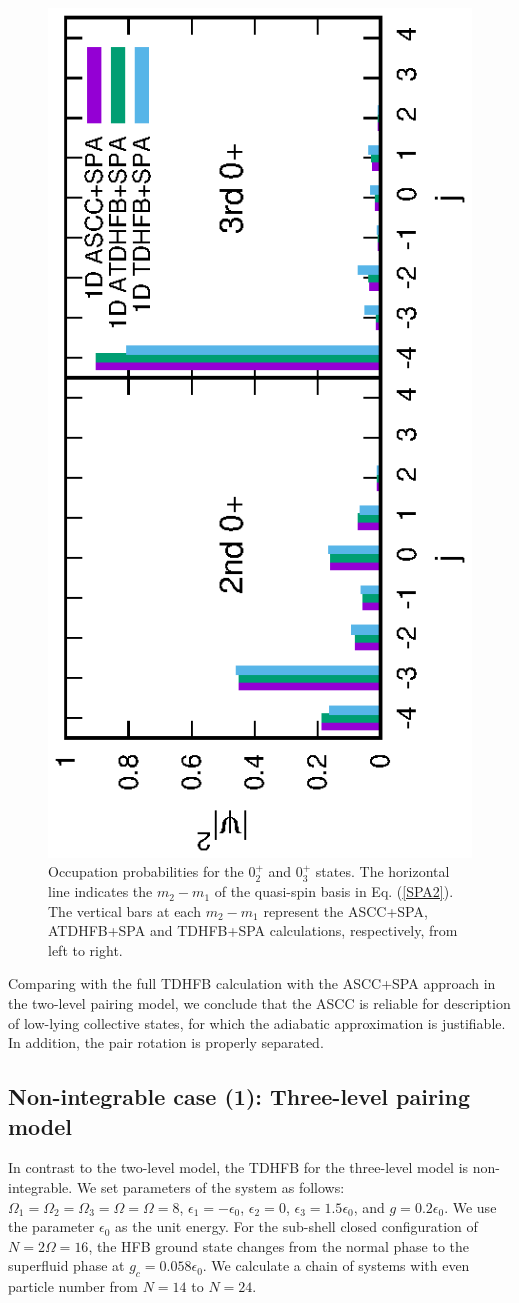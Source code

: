 \documentclass[%
superscriptaddress,
showpacs,
nofootinbib,
amsmath,amssymb,
aps,
prc,
twocolumn,
floatfix ]%
{revtex4-1}
\begin{document}
\begin{figure}[thb]
 \begin{center}
   \includegraphics[height=0.5\textwidth,angle=-90]{N16X3p2occ.eps}
 \end{center}
\caption{
Occupation probabilities for the $0_2^+$ and $0_3^+$ states.
The horizontal line indicates the $m_2-m_1$ of the quasi-spin basis
in Eq. (\ref{SPA2}).
The vertical bars at each $m_2-m_1$
represent the ASCC+SPA, ATDHFB+SPA and TDHFB+SPA calculations,
respectively, from left to right.
}
 \label{fig:N16_occ}
\end{figure}


Comparing with the full TDHFB calculation with the ASCC+SPA approach
in the two-level pairing model,
we conclude that the ASCC is reliable for description of low-lying
collective states, for which the adiabatic approximation is justifiable.
In addition, the pair rotation is properly separated.


\subsection{Non-integrable case (1): Three-level pairing model}
\label{sec:three-level-model}

In contrast to the two-level model,
the TDHFB for the three-level model is non-integrable.
We set parameters of the system as follows:
$\Omega_1=\Omega_2=\Omega_3=\Omega=\Omega=8$,
$\epsilon_1=-\epsilon_0$, $\epsilon_2=0$, $\epsilon_3=1.5\epsilon_0$,
and $g=0.2\epsilon_0$.
We use the parameter $\epsilon_0$ as the unit energy.
For the sub-shell closed configuration of $N=2\Omega=16$,
the HFB ground state changes from the normal phase to
the superfluid phase at $g_c=0.058\epsilon_0$.
We calculate a chain of systems with even particle number
from $N=14$ to $N=24$. 
\end{document}
